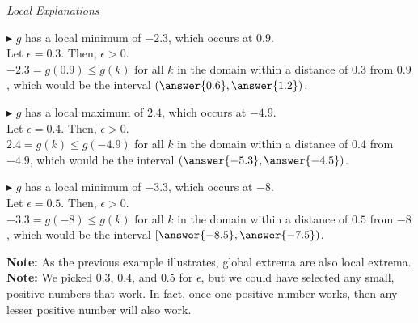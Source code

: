 \documentclass{ximera}
\begin{document}
\begin{explanation} \textit{Local Explanations}




$\blacktriangleright$ $g$ has a local minimum of $-2.3$, which occurs at $0.9$. \\


Let $\epsilon = 0.3$.  Then, $\epsilon > 0$.   \\
$-2.3 = g(0.9) \leq g(k)$ for all $k$ in the domain within a distance of $0.3$ from $0.9$, which would be the interval $\left(\answer{0.6}, \answer{1.2}\right)$.




$\blacktriangleright$ $g$ has a local maximum of $2.4$, which occurs at $-4.9$. \\






Let $\epsilon = 0.4$.  Then, $\epsilon > 0$.  \\
$2.4 = g(k) \leq g(-4.9)$ for all $k$ in the domain within a distance of $0.4$ from $-4.9$, which would be the interval $\left(\answer{-5.3}, \answer{-4.5}\right)$.




$\blacktriangleright$ $g$ has a local minimum of $-3.3$, which occurs at $-8$. \\





Let $\epsilon = 0.5$.  Then, $\epsilon > 0$. \\

$-3.3 = g(-8) \leq g(k)$ for all $k$ in the domain within a distance of $0.5$ from $-8$, which would be the interval $\left[\answer{-8.5}, \answer{-7.5}\right)$.


\end{explanation}


\textbf{Note:} As the previous example illustrates, global extrema are also local extrema. \\
\textbf{Note:} We picked $0.3$, $0.4$, and $0.5$ for $\epsilon$, but we could have selected any small, positive numbers that work. In fact, once one positive number works, then any lesser positive number will also work. \\
\end{document}
